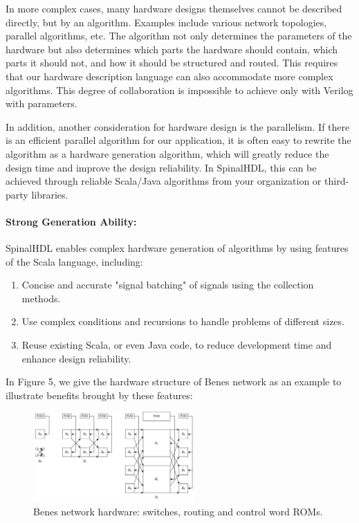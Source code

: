 \documentclass{article}
\begin{document}
In more complex cases, many hardware designs themselves cannot be described directly, but by an algorithm. Examples include various network topologies, parallel algorithms, etc. The algorithm not only determines the parameters of the hardware but also determines which parts the hardware should contain, which parts it should not, and how it should be structured and routed. This requires that our hardware description language can also accommodate more complex algorithms. This degree of collaboration is impossible to achieve only with Verilog with parameters.

In addition, another consideration for hardware design is the parallelism. If there is an efficient parallel algorithm for our application, it is often easy to rewrite the algorithm as a hardware generation algorithm, which will greatly reduce the design time and improve the design reliability. In SpinalHDL, this can be achieved through reliable Scala/Java algorithms from your organization or third-party libraries.

\paragraph{\textbf{Strong Generation Ability:}}

SpinalHDL enables complex hardware generation of algorithms by using features of the Scala language, including:
\begin{enumerate}
    \item Concise and accurate "signal batching" of signals using the collection methods.
    \item Use complex conditions and recursions to handle problems of different sizes.
    \item Reuse existing Scala, or even Java code, to reduce development time and enhance design reliability.
\end{enumerate}

In Figure 5, we give the hardware structure of Benes network as an example to illustrate benefits brought by these features:

\begin{figure}
\centering
\includegraphics[width=0.55\textwidth]{benes.drawio.png}
\caption{\label{fig:benes}Benes network hardware: switches, routing and control word ROMs.}
\end{figure}
\end{document}
